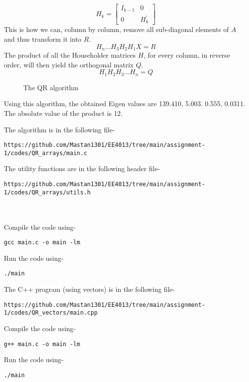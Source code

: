 \documentclass[journal,12pt,twocolumn]{IEEEtran}
\begin{document}
    $$
    H_{k}=\left[\begin{array}{cc}
    I_{k-1} & 0 \\
    0 & H_{k}^{\prime}
    \end{array}\right]
    $$
    This is how we can, column by column, remove all sub-diagonal elements of $A$ and thus transform it into $R$.
$$H_{n} \ldots H_{3} H_{2} H_{1} X=R$$
The product of all the Householder matrices $H$, for every column, in reverse order, will then yield the orthogonal matrix $Q$.
$$
H_{1} H_{2} H_{3} \ldots H_{n}=Q
$$

\begin{figure}[h!]
	\begin{center}
		\resizebox{\columnwidth/1}{!}{}
	\end{center}
	\caption{The QR algorithm}
	\label{fig:fig4}
\end{figure}

Using this algorithm, the obtained Eigen values are 139.410, 5.003. 0.555, 0.0311. The absolute value of the product is 12. 

The algorithm is in the following file- 
\begin{lstlisting}
https://github.com/Mastan1301/EE4013/tree/main/assignment-1/codes/QR_arrays/main.c
\end{lstlisting}
The utility functions are in the following header file- 
\begin{lstlisting}
https://github.com/Mastan1301/EE4013/tree/main/assignment-1/codes/QR_arrays/utils.h
\end{lstlisting}
\\ ~ \\
Compile the code using-
\begin{lstlisting}
gcc main.c -o main -lm
\end{lstlisting}
Run the code using-
\begin{lstlisting}
./main
\end{lstlisting}

The C++ program (using vectors) is in the following file-
\begin{lstlisting}
https://github.com/Mastan1301/EE4013/tree/main/assignment-1/codes/QR_vectors/main.cpp
\end{lstlisting}
Compile the code using-
\begin{lstlisting}
g++ main.c -o main -lm
\end{lstlisting}
Run the code using-
\begin{lstlisting}
./main
\end{lstlisting}
\end{document}
